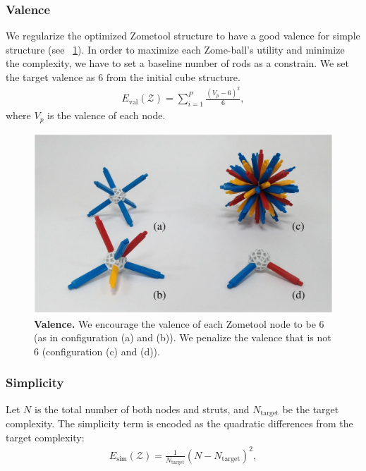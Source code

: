 \subsubsection{Valence}
We regularize the optimized Zometool structure to have a good valence for simple structure (see \figname~\ref{fig:Valence}). 
In order to maximize each Zome-ball's utility and minimize the complexity, we have to set a baseline number of rods as a constrain.
We set the target valence as $6$ from the initial cube structure.
\begin{align}
E_{\text{val}}(\mathcal{Z}) = \sum_{i=1}^{P} \frac{(V_p-6)^2}{6},
\end{align}
where $V_p$ is the valence of each node.

\begin{figure}[ht]
\centering
\includegraphics[width=1.0\linewidth]{figs/Valence.pdf} 
\caption{\textbf{Valence.} We encourage the valence of each Zometool node to be 6 (as in configuration (a) and (b)). 
We penalize the valence that is not 6 (configuration (c) and (d)).
}
\label{fig:Valence}
\end{figure}

\subsubsection{Simplicity}
Let $N$ is the total number of both nodes and struts, and $N_\text{target}$ be the target complexity.
The simplicity term is encoded as the quadratic differences from the target complexity:
\begin{align}
E_{\text{sim}}(\mathcal{Z}) = \frac{1}{N_{\text{target}}}(N-N_{\text{target}})^2,
\end{align}

